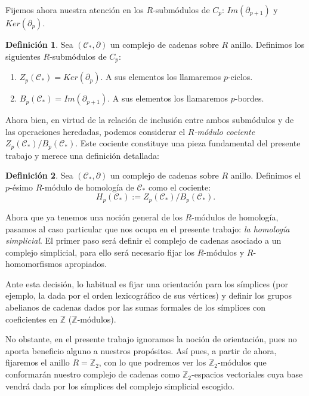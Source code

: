\documentclass[12pt, a4paper, twoside]{book}
\numberwithin{equation}{section}
\theoremstyle{definition}
\newtheorem{defi}{Definición}[section]
\theoremstyle{remark}
\theoremstyle{plain}
\begin{document}
	Fijemos ahora nuestra atención en los $R$-submódulos de $C_{p}$: 
	$Im(\partial_{p+1})$ y $Ker(\partial_{p})$.

	\begin{defi}
		Sea $(\mathcal{C}_{*},\partial)$ un complejo de cadenas sobre 
		$R$ anillo. 
		Definimos los siguientes $R$-submódulos de $C_{p}$:
		\begin{enumerate}
			\item $Z_{p}(\mathcal{C}_{*})=Ker(\partial_{p})$. A 
				sus elementos los llamaremos $p$-ciclos.
			\item $B_{p}(\mathcal{C}_{*})=Im(\partial_{p+1})$. A 
				sus elementos los llamaremos $p$-bordes.
		\end{enumerate}
	\end{defi}

	Ahora bien, en virtud de la relación de inclusión entre ambos 
	submódulos y de las operaciones heredadas, podemos considerar el 
	\emph{$R$-módulo cociente} $Z_{p}(\mathcal{C}_{*})/B_{p}(
	\mathcal{C}_{*})$. Este cociente constituye una pieza fundamental del 
	presente trabajo y merece una definición detallada:

	\begin{defi}
		Sea $(\mathcal{C}_{*},\partial)$ un complejo de cadenas sobre 
		$R$ anillo. Definimos el $p$-ésimo $R$-módulo de homología de
		$\mathcal{C}_{*}$ como el cociente:
		$$H_{p}(\mathcal{C}_{*}):=Z_{p}(\mathcal{C}_{*})/B_{p}(
		\mathcal{C}_{*}).$$
	\end{defi}

	Ahora que ya tenemos una noción general de los $R$-módulos de 
	homología, pasamos al caso particular que nos ocupa en el presente 
	trabajo: \emph{la homología simplicial}. El primer paso será definir 
	el complejo de cadenas asociado a un complejo simplicial, para ello 
	será necesario fijar los $R$-módulos y $R$-homomorfismos apropiados.

	Ante esta decisión, lo habitual es fijar una orientación para los 
	símplices (por ejemplo, la dada por el orden lexicográfico de sus 
	vértices) y 
	definir los grupos abelianos de cadenas dados por las sumas formales 
	de los símplices con coeficientes en $\mathbb{Z}$ 
	($\mathbb{Z}$-módulos). 

	No obstante, en el presente trabajo ignoramos 
	la noción de orientación, pues no aporta beneficio alguno a nuestros 
	propósitos. Así pues, a partir de ahora,
	fijaremos el anillo $R=\mathbb{Z}_{2}$, con lo que podremos ver los 
	$\mathbb{Z}_{2}$-módulos que conformarán nuestro complejo de cadenas 
	como $\mathbb{Z}_{2}$-espacios vectoriales cuya base vendrá dada por 
	los símplices del complejo simplicial escogido.
\end{document}
